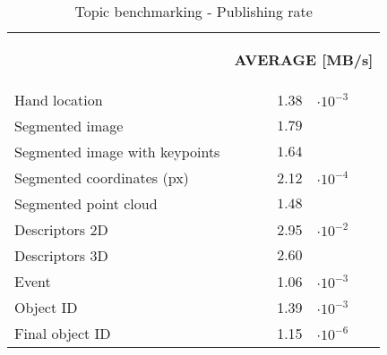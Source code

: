 \begin{itemize}
\begin{table}[H]
\centering
\begin{tabular} {l  l r@{}l }
\toprule
\addlinespace[3mm]
   \multicolumn{1}{c}{\begin{center}\textbf{TOPIC}\end{center}} &
   \multicolumn{3}{c}{\begin{flushright}\textbf{AVERAGE [MB/s]}\end{flushright}} &\\
\addlinespace[-3mm]
\midrule

Hand location && 1.38 & $\cdot10^{-3}$ \\
Segmented image && $1.79$\\
Segmented image with keypoints && $1.64$\\
Segmented coordinates (px) && 2.12&$\cdot10^{-4}$\\
Segmented point cloud && $1.48$\\
Descriptors 2D && 2.95&$\cdot10^{-2}$\\
Descriptors 3D && $2.60$\\
Event && 1.06&$\cdot10^{-3}$\\
Object ID && 1.39&$\cdot10^{-3}$\\
Final object ID && 1.15&$\cdot10^{-6}$\\
\bottomrule
\end{tabular}
\caption[Topic benchmarking - Publishing rate]{Topic benchmarking - Publishing rate}
\label{bw}

\end{table}


	\end{itemize}